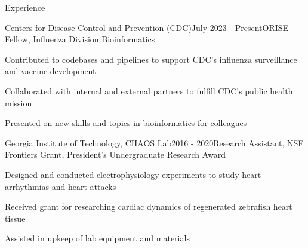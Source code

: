 \documentclass{resume} %
\begin{document}
\begin{rSection}{Experience}

  \begin{rSubsection}{Centers for Disease Control and Prevention (CDC)}{July 2023 - Present}{ORISE Fellow, Influenza Division Bioinformatics}{}
  \item Contributed to codebases and pipelines to support CDC's influenza surveillance and vaccine development
  \item Collaborated with internal and external partners to fulfill CDC's public health mission
  \item Presented on new skills and topics in bioinformatics for colleagues
  \end{rSubsection}


  \begin{rSubsection}{Georgia Institute of Technology, CHAOS Lab}{2016 - 2020}{Research Assistant, NSF Frontiers Grant, President's Undergraduate Research Award}{}
  \item Designed and conducted electrophysiology  experiments to study heart arrhythmias and heart attacks
  \item Received grant for researching cardiac dynamics of regenerated zebrafish heart tissue
  \item Assisted in upkeep of lab equipment and materials
  \end{rSubsection}



\end{rSection}
\end{document}
